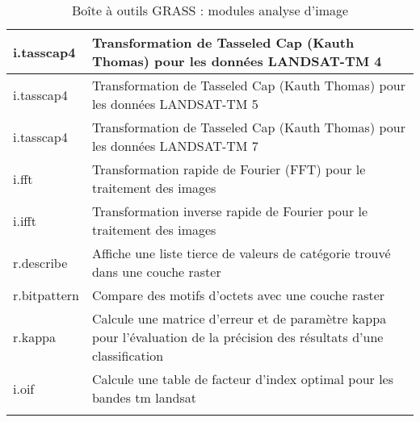 \begin{center}
{\begin{longtable}{|p{4cm}|p{10cm}|}
  \hline i.tasscap4 & Transformation de Tasseled Cap (Kauth Thomas) pour les données LANDSAT-TM 4 \\
  \hline i.tasscap4 & Transformation de Tasseled Cap (Kauth Thomas) pour les données LANDSAT-TM 5 \\
  \hline i.tasscap4 & Transformation de Tasseled Cap (Kauth Thomas) pour les données LANDSAT-TM 7 \\
  \hline i.fft & Transformation rapide de Fourier (FFT) pour le traitement des images \\
  \hline i.ifft & Transformation inverse rapide de Fourier pour le traitement des images \\
  \hline r.describe & Affiche une liste tierce de valeurs de catégorie trouvé dans une couche raster\\
  \hline r.bitpattern & Compare des motifs d'octets avec une couche raster\\
  \hline r.kappa & Calcule une matrice d'erreur et de paramètre kappa pour l'évaluation de la précision des résultats d'une classification \\
  \hline i.oif & Calcule une table de facteur d'index optimal pour les bandes tm landsat \\
\hline
\caption{Boîte à outils GRASS : modules analyse d'image}
\end{longtable}}
\end{center} 

